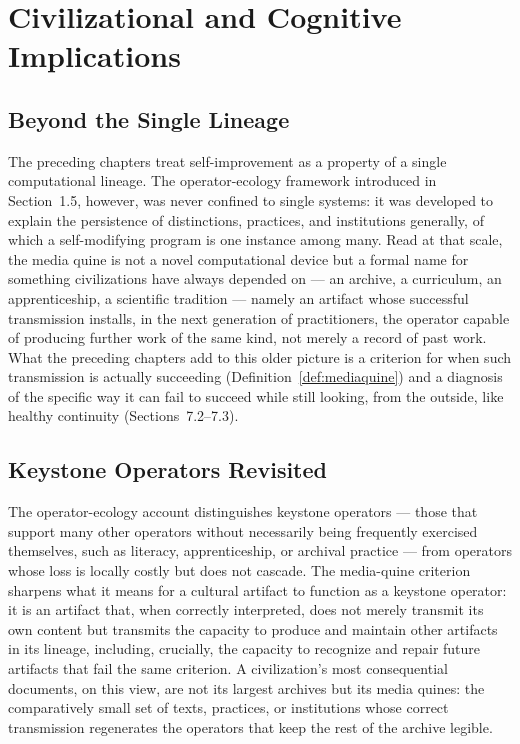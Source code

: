 \documentclass[11pt]{book}
\begin{document}
\chapter{Civilizational and Cognitive Implications}
\label{ch:civilizational}

\section{Beyond the Single Lineage}

The preceding chapters treat self-improvement as a property of a single computational lineage. The operator-ecology framework introduced in Section~1.5, however, was never confined to single systems: it was developed to explain the persistence of distinctions, practices, and institutions generally, of which a self-modifying program is one instance among many. Read at that scale, the media quine is not a novel computational device but a formal name for something civilizations have always depended on --- an archive, a curriculum, an apprenticeship, a scientific tradition --- namely an artifact whose successful transmission installs, in the next generation of practitioners, the operator capable of producing further work of the same kind, not merely a record of past work. What the preceding chapters add to this older picture is a criterion for when such transmission is actually succeeding (Definition~\ref{def:mediaquine}) and a diagnosis of the specific way it can fail to succeed while still looking, from the outside, like healthy continuity (Sections~7.2--7.3).

\section{Keystone Operators Revisited}

The operator-ecology account distinguishes keystone operators --- those that support many other operators without necessarily being frequently exercised themselves, such as literacy, apprenticeship, or archival practice --- from operators whose loss is locally costly but does not cascade. The media-quine criterion sharpens what it means for a cultural artifact to function as a keystone operator: it is an artifact that, when correctly interpreted, does not merely transmit its own content but transmits the capacity to produce and maintain other artifacts in its lineage, including, crucially, the capacity to recognize and repair future artifacts that fail the same criterion. A civilization's most consequential documents, on this view, are not its largest archives but its media quines: the comparatively small set of texts, practices, or institutions whose correct transmission regenerates the operators that keep the rest of the archive legible.
\end{document}
